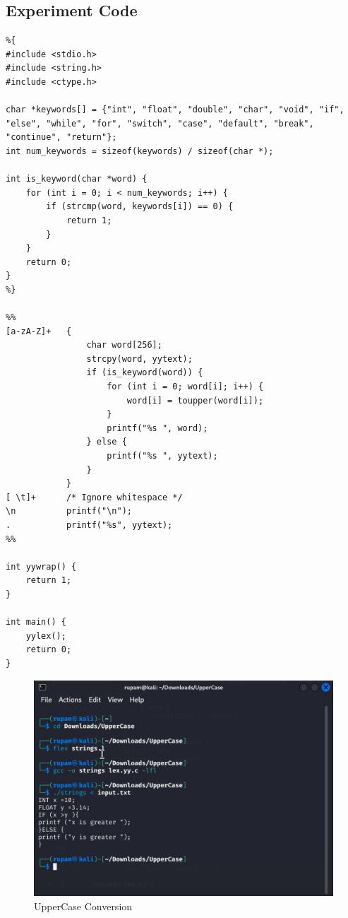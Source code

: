 \documentclass[12pt]{article}
\begin{document}
\subsection*{Experiment Code}
\begin{lstlisting}
%{
#include <stdio.h>
#include <string.h>
#include <ctype.h>

char *keywords[] = {"int", "float", "double", "char", "void", "if", "else", "while", "for", "switch", "case", "default", "break", "continue", "return"};
int num_keywords = sizeof(keywords) / sizeof(char *);

int is_keyword(char *word) {
    for (int i = 0; i < num_keywords; i++) {
        if (strcmp(word, keywords[i]) == 0) {
            return 1;
        }
    }
    return 0;
}
%}

%%
[a-zA-Z]+   {
                char word[256];
                strcpy(word, yytext);
                if (is_keyword(word)) {
                    for (int i = 0; word[i]; i++) {
                        word[i] = toupper(word[i]);
                    }
                    printf("%s ", word);
                } else {
                    printf("%s ", yytext);
                }
            }
[ \t]+      /* Ignore whitespace */
\n          printf("\n");
.           printf("%s", yytext);
%%

int yywrap() {
    return 1;
}

int main() {
    yylex();
    return 0;
}
\end{lstlisting}
\begin{figure}[H]
    \centering
    \includegraphics[width=1\linewidth]{exp10output.png}
    \caption{UpperCase Conversion}
\end{figure}
\end{document}

